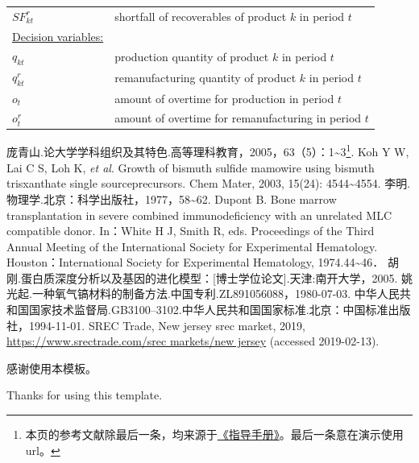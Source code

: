 \documentclass[zihao = -4, linespread = 1.5]{ctexart}
\begin{document}
\begin{table}[htbp]
\begin{tabularx}{\textwidth}{p{}X}
      $SF^r_{kt}$   &  shortfall of recoverables of product $k$ in period $t$\\
      \underline{Decision variables: } \\
      $q_{kt}$   &  production quantity of product $k$ in period $t$\\
      $q^r_{kt}$   &  remanufacturing quantity of product $k$ in period $t$  \\
      $o_{t}$   &  amount of overtime for production in period $t$  \\
      $o^r_{t}$   &  amount of overtime for remanufacturing in period $t$\\
      \bottomrule
     \end{tabularx}
    \end{table}


\clearpage
\setcounter{secnumdepth}{0} %

\begin{thebibliography}{99}\label{sec:bib}
\addtolength{\itemsep}{-1.5ex} %
庞青山.论大学学科组织及其特色.高等理科教育，2005，63（5）：1\~{}3\footnote{本页的参考文献除最后一条，均来源于\href{http://jwc.nankai.edu.cn/bylwwsjw/list.htm}{《指导手册》}。最后一条意在演示使用url。}.
Koh Y W, Lai C S, Loh K, \emph{et al}. Growth of bismuth sulfide mamowire using bismuth trisxanthate single sourceprecursors. Chem Mater, 2003, 15(24): 4544\~{}4554.
李明.物理学.北京：科学出版社，1977，58\~{}62.
Dupont B. Bone marrow transplantation in severe combined immunodeficiency with an unrelated MLC compatible donor. In：White H J, Smith R, eds. Proceedings of the Third Annual Meeting of the International Society for Experimental Hematology. Houston：International Society for Experimental Hematology, 1974.44\~{}46．
胡  刚.蛋白质深度分析以及基因的进化模型：[博士学位论文].天津:南开大学，2005.
姚光起.一种氧气镐材料的制备方法.中国专利.ZL891056088，1980-07-03.
中华人民共和国国家技术监督局.GB3100--3102.中华人民共和国国家标准.北京：中国标准出版社，1994-11-01.
SREC Trade, New jersey srec market, 2019, \url{https://www.srectrade.com/srec markets/new jersey} (accessed 2019-02-13).
\end{thebibliography}



\NKUThanksSection
感谢使用本模板。

Thanks for using this template.
\end{document}
